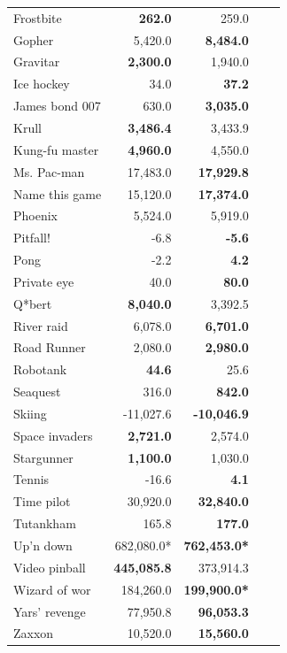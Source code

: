 \begin{table}[ht]
\begin{center}
\begin{small}
\begin{tabular}{lrrrl}
Frostbite       & \textbf{262.0}       & 259.0                \\
Gopher          & 5,420.0              & \textbf{8,484.0}     \\
Gravitar        & \textbf{2,300.0}     & 1,940.0              \\
Ice hockey      & 34.0                 & \textbf{37.2}        \\
James bond 007  & 630.0                & \textbf{3,035.0}     \\
Krull           & \textbf{3,486.4}     & 3,433.9              \\
Kung-fu master  & \textbf{4,960.0}     & 4,550.0              \\
Ms. Pac-man     & 17,483.0             & \textbf{17,929.8}    \\
Name this game  & 15,120.0             & \textbf{17,374.0}    \\
Phoenix         & 5,524.0              & 5,919.0              \\
Pitfall!        & -6.8                 & \textbf{-5.6}        \\
Pong            & -2.2                 & \textbf{4.2}         \\
Private eye     & 40.0                 & \textbf{80.0}        \\
Q*bert          & \textbf{8,040.0}     & 3,392.5              \\
River raid      & 6,078.0              & \textbf{6,701.0}     \\
Road Runner     & 2,080.0              & \textbf{2,980.0}     \\
Robotank        & \textbf{44.6}        & 25.6                 \\
Seaquest        & 316.0                & \textbf{842.0}       \\
Skiing          & -11,027.6            & \textbf{-10,046.9}   \\
Space invaders  & \textbf{2,721.0}     & 2,574.0              \\
Stargunner      & \textbf{1,100.0}     & 1,030.0              \\
Tennis          & -16.6                & \textbf{4.1}         \\
Time pilot      & 30,920.0             & \textbf{32,840.0}    \\
Tutankham       & 165.8                & \textbf{177.0}       \\
Up'n down       & 682,080.0*            & \textbf{762,453.0*}   \\
Video pinball   & \textbf{445,085.8}   & 373,914.3            \\
Wizard of wor   & 184,260.0            & \textbf{199,900.0*}   \\
Yars' revenge   & 77,950.8             & \textbf{96,053.3}    \\
Zaxxon          & 10,520.0             & \textbf{15,560.0}    \\


\end{tabular}
\end{small}
\end{center}
\end{table}
